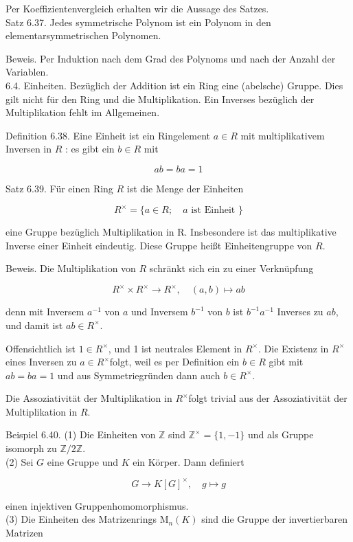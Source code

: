 \documentclass[10pt, letterpaper]{article}
\begin{document}
Per Koeffizientenvergleich erhalten wir die Aussage des Satzes.\\
Satz 6.37. Jedes symmetrische Polynom ist ein Polynom in den elementarsymmetrischen Polynomen.

Beweis. Per Induktion nach dem Grad des Polynoms und nach der Anzahl der Variablen.\\
6.4. Einheiten. Bezüglich der Addition ist ein Ring eine (abelsche) Gruppe. Dies gilt nicht für den Ring und die Multiplikation. Ein Inverses bezüglich der Multiplikation fehlt im Allgemeinen.

Definition 6.38. Eine Einheit ist ein Ringelement $a \in R$ mit multiplikativem Inversen in $R$ : es gibt ein $b \in R$ mit

$$
a b=b a=1
$$

Satz 6.39. Für einen Ring $R$ ist die Menge der Einheiten

$$
R^{\times}=\{a \in R ; \quad a \text { ist Einheit }\}
$$

eine Gruppe bezüglich Multiplikation in R. Insbesondere ist das multiplikative Inverse einer Einheit eindeutig. Diese Gruppe heißt Einheitengruppe von $R$.

Beweis. Die Multiplikation von $R$ schränkt sich ein zu einer Verknüpfung

$$
R^{\times} \times R^{\times} \rightarrow R^{\times}, \quad(a, b) \mapsto a b
$$

denn mit Inversem $a^{-1}$ von $a$ und Inversem $b^{-1}$ von $b$ ist $b^{-1} a^{-1}$ Inverses zu $a b$, und damit ist $a b \in R^{\times}$.

Offensichtlich ist $1 \in R^{\times}$, und 1 ist neutrales Element in $R^{\times}$. Die Existenz in $R^{\times}$eines Inversen zu $a \in R^{\times}$folgt, weil es per Definition ein $b \in R$ gibt mit $a b=b a=1$ und aus Symmetriegründen dann auch $b \in R^{\times}$.

Die Assoziativität der Multiplikation in $R^{\times}$folgt trivial aus der Assoziativität der Multiplikation in $R$.

Beispiel 6.40. (1) Die Einheiten von $\mathbb{Z}$ sind $\mathbb{Z}^{\times}=\{1,-1\}$ und als Gruppe isomorph zu $\mathbb{Z} / 2 \mathbb{Z}$.\\
(2) Sei $G$ eine Gruppe und $K$ ein Körper. Dann definiert

$$
G \rightarrow K[G]^{\times}, \quad g \mapsto g
$$

einen injektiven Gruppenhomomorphismus.\\
(3) Die Einheiten des Matrizenrings $\mathrm{M}_{n}(K)$ sind die Gruppe der invertierbaren Matrizen
\end{document}
